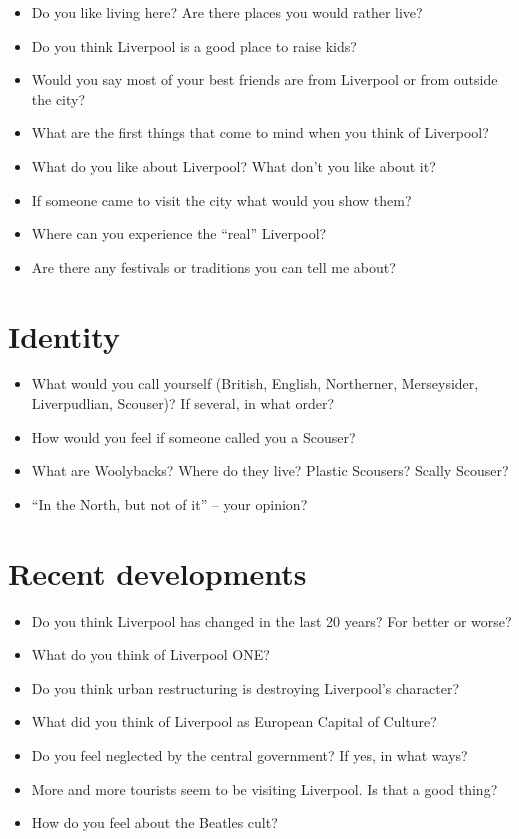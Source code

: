 {		\begin{itemize}
			\item Do you like living here? Are there places you would rather live?
			\item Do you think Liverpool is a good place to raise kids?
			\item Would you say most of your best friends are from Liverpool or from outside the city?
			\item What are the first things that come to mind when you think of Liverpool?
			\item What do you like about Liverpool? What don't you like about it?
			\item If someone came to visit the city what would you show them?
			\item Where can you experience the \enquote{real} Liverpool?
			\item Are there any festivals or traditions you can tell me about?
		\end{itemize}
	
	
	\section*{Identity}
	
		\begin{itemize}
			\item What would you call yourself (British, English, Northerner, Merseysider, Liverpudlian, Scouser)? If several, in what order?
			\item How would you feel if someone called you a Scouser?
			\item What are Woolybacks? Where do they live? Plastic Scousers? Scally Scouser?
			\item ``In the North, but not of it'' -- your opinion?
		\end{itemize}
	
	
	\section*{Recent developments}
	
		\begin{itemize}
			\item Do you think Liverpool has changed in the last 20 years? For better or worse?
			\item What do you think of Liverpool ONE?
			\item Do you think urban restructuring is destroying Liverpool's character?
			\item What did you think of Liverpool as European Capital of Culture?
			\item Do you feel neglected by the central government? If yes, in what ways?
			\item More and more tourists seem to be visiting Liverpool. Is that a good thing?
			\item How do you feel about the Beatles cult?
		\end{itemize}
	
}
